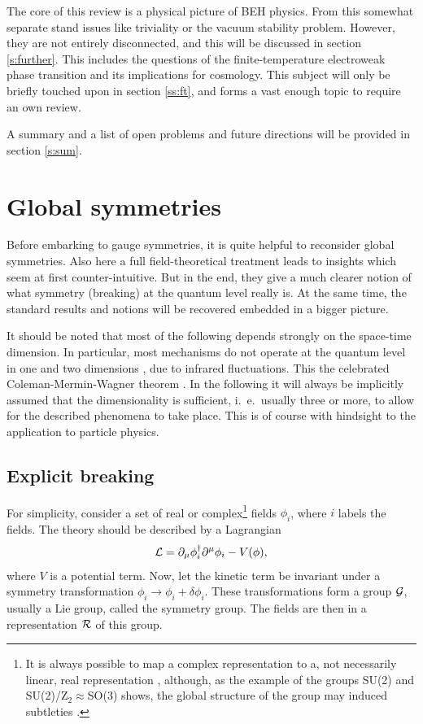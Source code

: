 \documentclass[final,12pt,3p,longtitle]{elsarticle}
\newcommand*{\La}{{\cal{L}}}
\newcommand*{\no}{\noindent}
\newcommand*{\be}{\begin{equation}}
\newcommand*{\ee}{\end{equation}}
\newcommand*{\pd}{\partial}
\newcommand*{\pdm}{\pd_{\mu}}
\newcommand*{\1}{1\!\!\!\bot}
\begin{document}
The core of this review is a physical picture of BEH physics. From this somewhat separate stand issues like triviality or the vacuum stability problem. However, they are not entirely disconnected, and this will be discussed in section \ref{s:further}. This includes the questions of the finite-temperature electroweak phase transition and its implications for cosmology. This subject will only be briefly touched upon in section \ref{ss:ft}, and forms a vast enough topic to require an own review.

A summary and a list of open problems and future directions will be provided in section \ref{s:sum}.

\section{Global symmetries}\label{s:global}

Before embarking to gauge symmetries, it is quite helpful to reconsider global symmetries. Also here a full field-theoretical treatment \cite{Strocchi:2015uaa} leads to insights which seem at first counter-intuitive. But in the end, they give a much clearer notion of what symmetry (breaking) at the quantum level really is. At the same time, the standard results and notions will be recovered embedded in a bigger picture.

It should be noted that most of the following depends strongly on the space-time dimension. In particular, most mechanisms do not operate at the quantum level in one and two dimensions \cite{Frohlich:1978px,Strocchi:2015uaa}, due to infrared fluctuations. This the celebrated Coleman-Mermin-Wagner theorem \cite{Strocchi:2015uaa,Mermin:1966fe,Coleman:1973ci}. In the following it will always be implicitly assumed that the dimensionality is sufficient, i.\ e.\ usually three or more, to allow for the described phenomena to take place. This is of course with hindsight to the application to particle physics.

\subsection{Explicit breaking}\label{ss:gsym}

For simplicity, consider a set of real or complex\footnote{It is always possible to map a complex representation to a, not necessarily linear, real representation \cite{Bohm:2001yx,O'Raifeartaigh:1978kv,Sartori:1992ib}, although, as the example of the groups SU(2) and SU(2)/Z$_2\approx$SO(3) shows, the global structure of the group may induced subtleties \cite{O'Raifeartaigh:1978kv,Heissenberg:2015tji}.} fields $\phi_i$, where $i$ labels the fields. The theory should be described by a Lagrangian
\be
\La=\pdm\phi^\dagger_i\pd^\mu\phi_i-V(\phi)\label{linsig},
\ee
\no where $V$ is a potential term. Now, let the kinetic term be invariant under a symmetry transformation $\phi_i\to\phi_i+\delta\phi_i$. These transformations form a group ${\cal G}$, usually a Lie group, called the symmetry group. The fields are then in a representation ${\cal R}$ of this group.
\end{document}
